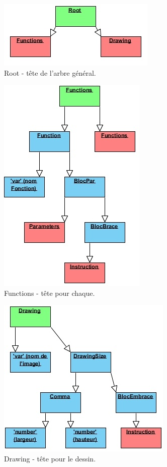 \documentclass[11pt]{report} %
\begin{document}
\begin{figure}[h]
    \centering
    \includegraphics[scale=1]{img/root.jpg}
    \caption{\label{CG} Root - tête de l'arbre général.}
\end{figure}
\begin{figure}[h]
    \centering
    \includegraphics[scale=1]{img/functions.jpg}
    \caption{\label{CG} Functions - tête pour chaque.}
\end{figure}
\begin{figure}[h]
    \centering
    \includegraphics[scale=1]{img/drawing.jpg}
    \caption{\label{CG} Drawing - tête pour le dessin.}
\end{figure}
\end{document}
